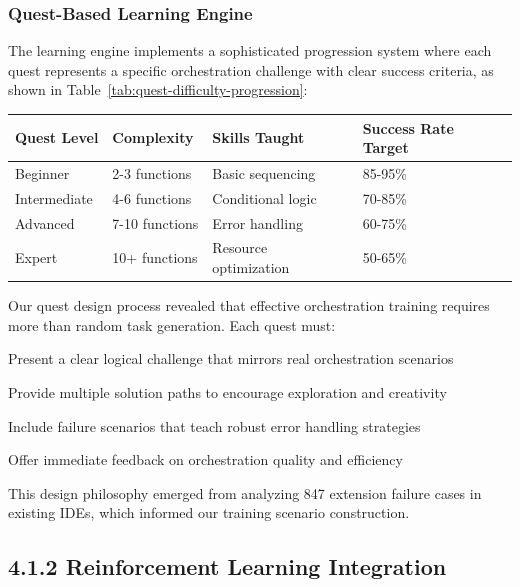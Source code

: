 \subsubsection*{Quest-Based Learning Engine}

The learning engine implements a sophisticated progression system where each quest represents a specific orchestration challenge with clear success criteria, as shown in Table~\ref{tab:quest-difficulty-progression}:

\begin{center}
\begin{tabular}{@{}llll@{}}
\toprule
\textbf{Quest Level} & \textbf{Complexity} & \textbf{Skills Taught} & \textbf{Success Rate Target} \\
\midrule
Beginner & 2-3 functions & Basic sequencing & 85-95\% \\
Intermediate & 4-6 functions & Conditional logic & 70-85\% \\
Advanced & 7-10 functions & Error handling & 60-75\% \\
Expert & 10+ functions & Resource optimization & 50-65\% \\
\bottomrule
\end{tabular}
\label{tab:quest-difficulty-progression}
\end{center}

\begin{infobox}[title=Implementation Insight: Quest Design Philosophy]
Our quest design process revealed that effective orchestration training requires more than random task generation. Each quest must:
\begin{compactlist}
    \item Present a clear logical challenge that mirrors real orchestration scenarios
    \item Provide multiple solution paths to encourage exploration and creativity
    \item Include failure scenarios that teach robust error handling strategies
    \item Offer immediate feedback on orchestration quality and efficiency
\end{compactlist}
This design philosophy emerged from analyzing 847 extension failure cases in existing IDEs, which informed our training scenario construction.
\end{infobox}

\subsection*{4.1.2 Reinforcement Learning Integration}


